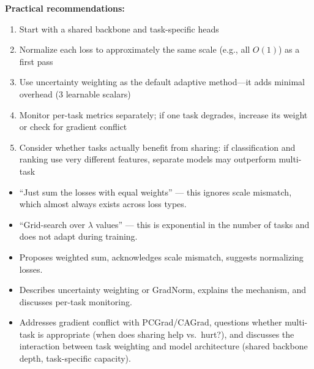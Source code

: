 \begin{interviewq}
\textbf{Practical recommendations:}
\begin{enumerate}
    \item Start with a shared backbone and task-specific heads
    \item Normalize each loss to approximately the same scale (e.g., all $O(1)$) as a first pass
    \item Use uncertainty weighting as the default adaptive method---it adds minimal overhead (3 learnable scalars)
    \item Monitor per-task metrics separately; if one task degrades, increase its weight or check for gradient conflict
    \item Consider whether tasks actually benefit from sharing: if classification and ranking use very different features, separate models may outperform multi-task
\end{enumerate}

\redflags
\begin{itemize}
    \item ``Just sum the losses with equal weights'' --- this ignores scale mismatch, which almost always exists across loss types.
    \item ``Grid-search over $\lambda$ values'' --- this is exponential in the number of tasks and does not adapt during training.
\end{itemize}


\goodgreat
\begin{itemize}
    \item {} Proposes weighted sum, acknowledges scale mismatch, suggests normalizing losses.
    \item {} Describes uncertainty weighting or GradNorm, explains the mechanism, and discusses per-task monitoring.
    \item {} Addresses gradient conflict with PCGrad/CAGrad, questions whether multi-task is appropriate (when does sharing help vs.\ hurt?), and discusses the interaction between task weighting and model architecture (shared backbone depth, task-specific capacity).
\end{itemize}

\end{interviewq}

